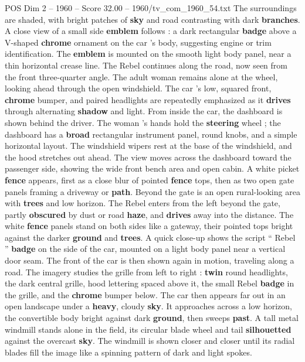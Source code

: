 \begin{textsample}{POS Dim 2 – 1960 – Score 32.00 – 1960/tv\_com\_1960\_54.txt}
The surroundings are shaded, with bright patches of \textbf{sky} and road contrasting with dark \textbf{branches}.
A close view of a small side \textbf{emblem} follows : a dark rectangular \textbf{badge} above a V-shaped \textbf{chrome} ornament on the car ’s body, suggesting engine or trim identification.
The \textbf{emblem} is mounted on the smooth light body panel, near a thin horizontal crease line.
The Rebel continues along the road, now seen from the front three-quarter angle.
The adult woman remains alone at the wheel, looking ahead through the open windshield.
The car ’s low, squared front, \textbf{chrome} bumper, and paired headlights are repeatedly emphasized as it \textbf{drives} through alternating \textbf{shadow} and light.
From inside the car, the dashboard is shown behind the driver.
The woman ’s hands hold the \textbf{steering} wheel ; the dashboard has a \textbf{broad} rectangular instrument panel, round knobs, and a simple horizontal layout.
The windshield wipers rest at the base of the windshield, and the hood stretches out ahead.
The view moves across the dashboard toward the passenger side, showing the wide front bench area and open cabin.
A white picket \textbf{fence} appears, first as a close blur of pointed \textbf{fence} tops, then as two open gate panels framing a driveway or \textbf{path}.
Beyond the gate is an open rural-looking area with \textbf{trees} and low horizon.
The Rebel enters from the left beyond the gate, partly \textbf{obscured} by dust or road \textbf{haze}, and \textbf{drives} away into the distance.
The white \textbf{fence} panels stand on both sides like a gateway, their pointed tops bright against the darker \textbf{ground} and \textbf{trees}.
A quick close-up shows the script “ Rebel ” \textbf{badge} on the side of the car, mounted on a light body panel near a vertical door seam.
The front of the car is then shown again in motion, traveling along a road.
The imagery studies the grille from left to right : \textbf{twin} round headlights, the dark central grille, hood lettering spaced above it, the small Rebel \textbf{badge} in the grille, and the \textbf{chrome} bumper below.
The car then appears far out in an open landscape under a \textbf{heavy}, cloudy \textbf{sky}.
It approaches across a low horizon, the convertible body bright against dark \textbf{ground}, then sweeps \textbf{past}.
A tall metal windmill stands alone in the field, its circular blade wheel and tail \textbf{silhouetted} against the overcast \textbf{sky}.
The windmill is shown closer and closer until its radial blades fill the image like a spinning pattern of dark and light spokes.

\end{textsample}
